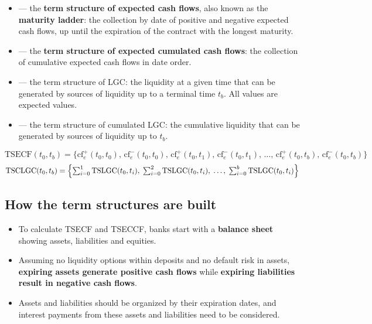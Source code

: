 \begin{lrdefbox}
\begin{itemize}
\item {} --- the \textbf{term structure of expected cash flows}, also known as the \textbf{maturity ladder}: the collection by date of positive and negative expected cash flows, up until the expiration of the contract with the longest maturity.
\item {} --- the \textbf{term structure of expected cumulated cash flows}: the collection of cumulative expected cash flows in date order.
\item {} --- the term structure of LGC: the liquidity at a given time that can be generated by sources of liquidity up to a terminal time $t_b$. All values are expected values.
\item {} --- the term structure of cumulated LGC: the cumulative liquidity that can be generated by sources of liquidity up to $t_b$.
\end{itemize}
\end{lrdefbox}

\begin{lrfmlbox}
\[ \text{TSECF}(t_0,t_b) = \bigl\{ \text{cf}^{+}_{e}(t_0,t_0),\, \text{cf}^{-}_{e}(t_0,t_0),\, \text{cf}^{+}_{e}(t_0,t_1),\, \text{cf}^{-}_{e}(t_0,t_1),\, \ldots,\, \text{cf}^{+}_{e}(t_0,t_b),\, \text{cf}^{-}_{e}(t_0,t_b) \bigr\} \]
\[ \text{TSCLGC}(t_0,t_b) = \Bigl\{ \textstyle\sum_{i=0}^{1}\text{TSLGC}(t_0,t_i),\; \sum_{i=0}^{2}\text{TSLGC}(t_0,t_i),\; \ldots,\; \sum_{i=0}^{b}\text{TSLGC}(t_0,t_i) \Bigr\} \]
\end{lrfmlbox}

\subsection{How the term structures are built}

\begin{itemize}
\item To calculate TSECF and TSECCF, banks start with a \textbf{balance sheet} showing assets, liabilities and equities.
\item Assuming no liquidity options within deposits and no default risk in assets, \textbf{expiring assets generate positive cash flows} while \textbf{expiring liabilities result in negative cash flows}.
\item Assets and liabilities should be organized by their expiration dates, and interest payments from these assets and liabilities need to be considered.
\end{itemize}

